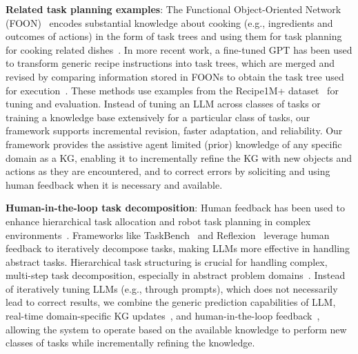 \vspace{-0.75em}
\textbf{Related task planning examples}: The Functional Object-Oriented Network (FOON)~\cite{paulius2016functional} encodes substantial knowledge about cooking (e.g., ingredients and outcomes of actions) in the form of task trees and using them for task planning for cooking related dishes~\cite{ding2022robottaskplanningsituation,bhat2024groundingllmsrobottask,jiang2019task,sakib2022approximate}. In more recent work, a fine-tuned GPT has been used to transform generic recipe instructions into task trees, which are merged and revised by comparing information stored in FOONs to obtain the task tree used for execution~\cite{sakib2024cooking}. %
These methods use examples from the Recipe1M+ dataset~\cite{marin2021recipe1m+} for tuning and evaluation. Instead of tuning an LLM across classes of tasks or training a knowledge base extensively for a particular class of tasks, our framework supports incremental revision, faster adaptation, and reliability. Our framework provides the assistive agent limited (prior) knowledge of any specific domain as a KG, enabling it to incrementally refine the KG with new objects and actions as they are encountered, and to correct errors by soliciting and using human feedback when it is necessary and available. %

\vspace{-0.75em}
\textbf{Human-in-the-loop task decomposition}: Human feedback has been used to enhance hierarchical task allocation and robot task planning in complex environments~\cite{marzari2021towards,zhen2023robottaskplanningbased}. Frameworks like TaskBench~\cite{shen2023taskbench} and Reflexion~\cite{shinn2024reflexion} leverage human feedback to iteratively decompose tasks, making LLMs more effective in handling abstract tasks. Hierarchical task structuring is crucial for handling complex, multi-step task decomposition, especially in abstract problem domains~\cite{holler2020hddl}. Instead of iteratively tuning LLMs (e.g., through prompts), which does not necessarily lead to correct results, we combine the generic prediction capabilities of LLM, real-time domain-specific KG updates~\cite{DING2019105,article}, and human-in-the-loop feedback~\cite{kasaei2024vitalvisualteleoperationenhance,liu2023robotlearningjobhumanintheloop,9044335,emami2024human,wu2022survey},  allowing the system to operate based on the available knowledge to perform new classes of tasks while incrementally refining the knowledge.

